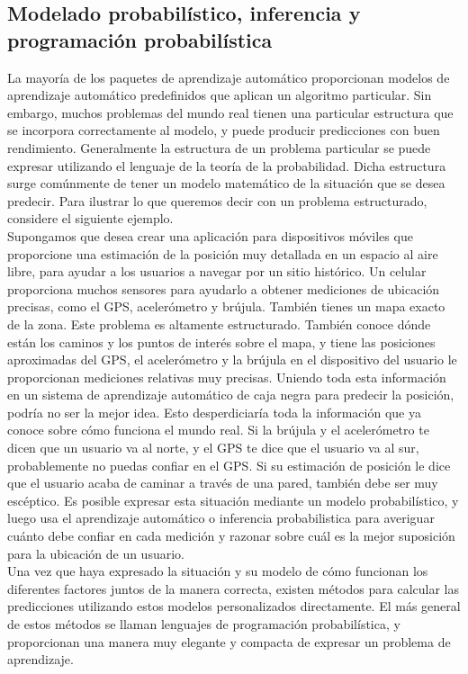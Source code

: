  
\subsection{Modelado probabilístico, inferencia y programación probabilística}

La mayoría de los paquetes de aprendizaje automático proporcionan modelos de aprendizaje automático predefinidos que aplican un algoritmo particular. Sin embargo, muchos problemas del mundo real tienen 
una  particular  estructura  que se incorpora correctamente al modelo, y puede producir predicciones con buen  rendimiento.    Generalmente la estructura de un problema particular se puede expresar
utilizando el lenguaje de la teoría de la probabilidad. Dicha estructura surge comúnmente 
de tener un modelo matemático de la situación que se  desea predecir.  
Para ilustrar lo que queremos decir con un problema estructurado, considere el siguiente ejemplo.\\


Supongamos que desea crear una aplicación para dispositivos móviles que proporcione una estimación de la  posición muy detallada en un espacio al aire libre, para ayudar a los usuarios a 
navegar por un sitio histórico. 
Un celular proporciona muchos sensores para ayudarlo a obtener mediciones de 
ubicación precisas, como el GPS, acelerómetro y brújula. También tienes un mapa 
exacto de la zona. Este problema es altamente  estructurado. 
También  conoce  dónde están los caminos y los puntos de interés sobre el mapa, y  tiene las posiciones aproximadas del GPS, el acelerómetro y la brújula en el dispositivo
del usuario le proporcionan mediciones relativas muy precisas.
Uniendo toda esta información en un sistema de aprendizaje automático de caja negra para predecir 
la posición, podría no ser la mejor idea. Esto desperdiciaría toda la información que ya conoce  sobre cómo funciona el mundo real.
Si la brújula y el acelerómetro te dicen que un usuario va al norte, 
y el GPS te dice que el usuario va al sur, probablemente no puedas confiar en el GPS.
Si su estimación de posición le dice que el usuario acaba de caminar
a través de una pared, también debe ser muy escéptico.
Es posible expresar esta situación mediante un modelo probabilístico,  y luego usa el aprendizaje automático o  inferencia probabilistica para averiguar cuánto debe confiar en cada medición y razonar
sobre cuál es la mejor suposición para la ubicación de un usuario.\\


Una vez que haya expresado la situación y su modelo de cómo funcionan los diferentes factores
juntos de la manera correcta, existen métodos para calcular las predicciones utilizando estos
modelos personalizados directamente.  
El más general de estos métodos se llaman lenguajes de programación probabilística, 
y proporcionan una manera muy elegante y compacta de expresar un problema de aprendizaje.

